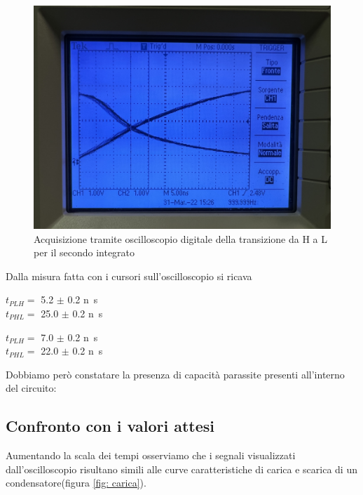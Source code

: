 \documentclass[10pt, a4paper, italian]{article}
\begin{document}
\begin{figure}[htbp]
\centering
	\includegraphics[width=\textwidth]{HL2}
	\caption{Acquisizione tramite oscilloscopio digitale della transizione da
	H a L per il secondo integrato}
\end{figure}

Dalla misura fatta con i cursori sull'oscilloscopio si ricava
\begin{multicols}{2}
    \centering
    $t_{PLH}=$ 5.2 $\pm$ 0.2 \si{n\s} \\
    $t_{PHL}=$ 25.0 $\pm$ 0.2 \si{n\s}
    
    $t_{PLH}=$ 7.0 $\pm$ 0.2 \si{n\s} \\
    $t_{PHL}=$ 22.0 $\pm$ 0.2 \si{n\s}
\end{multicols}

Dobbiamo però constatare la presenza di capacità parassite presenti all'interno del circuito:
\subsection{Confronto con i valori attesi}
Aumentando la scala dei tempi osserviamo che i segnali visualizzati
dall'oscilloscopio risultano simili alle curve caratteristiche di carica e
scarica di un condensatore(figura \cref{fig: carica}).
\end{document}
